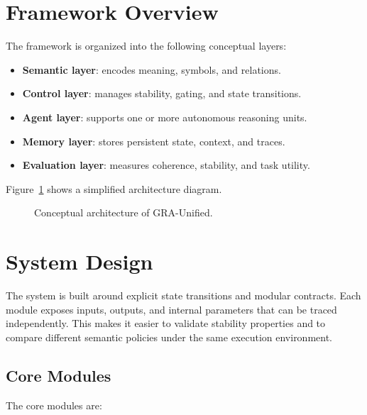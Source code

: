 \documentclass[11pt,a4paper]{article}
\begin{document}
\section{Framework Overview}
The framework is organized into the following conceptual layers:

\begin{itemize}
    \item \textbf{Semantic layer}: encodes meaning, symbols, and relations.
    \item \textbf{Control layer}: manages stability, gating, and state transitions.
    \item \textbf{Agent layer}: supports one or more autonomous reasoning units.
    \item \textbf{Memory layer}: stores persistent state, context, and traces.
    \item \textbf{Evaluation layer}: measures coherence, stability, and task utility.
\end{itemize}

Figure~\ref{fig:architecture} shows a simplified architecture diagram.

\begin{figure}[H]
    \centering
    \caption{Conceptual architecture of GRA-Unified.}
    \label{fig:architecture}
\end{figure}

\section{System Design}
The system is built around explicit state transitions and modular contracts. Each module exposes inputs, outputs, and internal parameters that can be traced independently. This makes it easier to validate stability properties and to compare different semantic policies under the same execution environment.

\subsection{Core Modules}
The core modules are:
\end{document}

